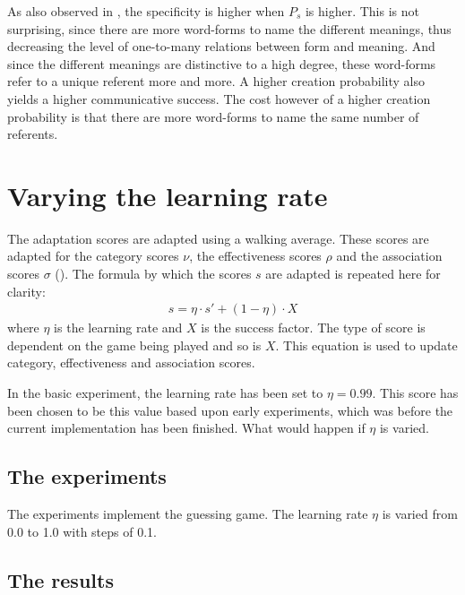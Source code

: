 As also observed in , the specificity is higher when $P_s$ is higher. This is not surprising, since there are more word-forms to name the different meanings, thus decreasing the level of one-to-many relations between form and meaning. And since the different meanings are distinctive to a high degree, these word-forms refer to a unique referent more and more. A higher creation probability also yields a higher communicative success. The cost however of a higher creation probability is that there are more word-forms to name the same number of referents.

\section{Varying the learning rate}\label{s:par:lr}

The adaptation scores are adapted using a walking average. These scores are adapted for the category scores $\nu$, the effectiveness scores $\rho$ and the association scores $\sigma$ (). The formula by which the scores $s$ are adapted is repeated here for clarity:
\begin{eqnarray}
s = \eta \cdot s' + (1-\eta)\cdot X
\end{eqnarray}
\noindent where $\eta$ is the learning rate and $X$ is the success factor. The type of score is dependent on the game being played and so is $X$. This equation is used to update category, effectiveness and association scores.

In the basic experiment, the learning rate has been set to $\eta=0.99$. This score has been chosen to be this value based upon early experiments, which was before the current implementation has been finished. What would happen if $\eta$ is varied.

\subsection{The experiments}

The experiments implement the guessing game. The learning rate $\eta$ is varied from 0.0 to 1.0 with steps of 0.1.


\subsection{The results}


